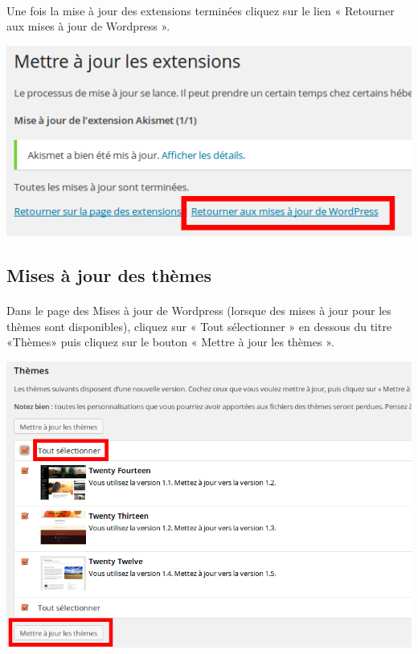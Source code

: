 \documentclass[10pt,a4paper]{article}
\begin{document}
\paragraph{}Une fois la mise à jour des extensions terminées cliquez sur le lien « Retourner aux mises à jour de Wordpress ».
\begin{center}
\includegraphics[scale=0.35]{img/0054.png}
\end{center}
\subsection{Mises à jour des thèmes}
\paragraph{}Dans le page des Mises à jour de Wordpress (lorsque des mises à jour pour les thèmes sont disponibles), cliquez sur « Tout sélectionner » en dessous du titre «Thèmes» puis cliquez sur le bouton « Mettre à jour les thèmes ».
\begin{center}
\includegraphics[scale=0.35]{img/0055.png}
\end{center}
\end{document}
